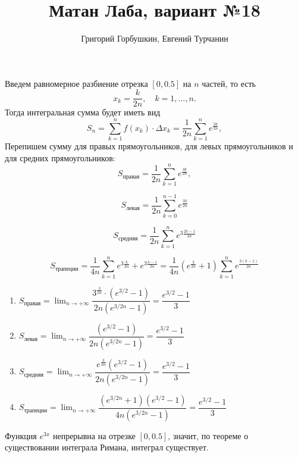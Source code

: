 \documentclass{report}
\title{\Huge{Матан Лаба, вариант №18}}
\author{\huge{Григорий Горбушкин, Евгений Турчанин}}
\date{}
\begin{document}
\maketitle

\noindent Введем равномерное разбиение отрезка $[0, 0.5]$ на $n$ частей, то есть
\begin{equation}
    x_k = \frac{k}{2n}, \quad k = 1, \ldots, n.
\end{equation}
Тогда интегральная сумма будет иметь вид
\begin{equation}
    S_n = \sum_{k=1}^{n} f(x_k) \cdot \Delta x_k = \frac{1}{2n} \sum_{k=1}^{n} e^{\frac{3k}{2n}},
\end{equation}
Перепишем сумму для правых прямоугольников, для левых прямоугольников и для средних прямоугольников:
\begin{equation}
    S_\text{правая} = \frac{1}{2n} \sum_{k=1}^{n} e^{\frac{3k}{2n}},
\end{equation}

\begin{equation}
    S_{\text{левая}} = \frac{1}{2n} \sum_{k=0}^{n-1} e^{\frac{3k}{2n}}
\end{equation}

\begin{equation}
    S_{\text{средняя}} = \frac{1}{2n} \sum_{k=1}^{n} e^{3\frac{2k-1}{4n}}
\end{equation}

\begin{equation}
    S_{\text{трапеции}} = \frac{1}{4n} \sum_{k=1}^{n} e^{3\frac{k}{2n}}+e^{3\frac{k-1}{2n}} =
    \frac{1}{4n}\left(e^{\frac{3}{2n}}+1 \right)\sum_{k=1}^{n} e^{\frac{3(k-1)}{2n}}
\end{equation}


\begin{enumerate}
    \item $S_{\text{правая}} = \displaystyle\lim_ {n \to +\infty} \dfrac{3^{\frac{3}{2n}}\cdot(e^{3/2}-1)}{2n(e^{3/2n}-1)} = \dfrac{e^{3/2}-1}{3}$
    \item $S_{\text{левая}} = \displaystyle\lim_ {n \to +\infty} \dfrac{(e^{3/2}-1)}{2n(e^{3/2n}-1)} = \dfrac{e^{3/2}-1}{3}$
    \item $S_{\text{средняя}} = \displaystyle\lim_ {n \to +\infty} \dfrac{e^{\frac{3}{4n}}(e^{3/2}-1)}{2n(e^{3/2n}-1)} = \dfrac{e^{3/2}-1}{3}$
    \item $S_{\text{трапеции}} = \displaystyle\lim_ {n \to +\infty} \dfrac{(e^{3/2n}+1)(e^{3/2}-1)}{4n(e^{3/2n}-1)} = \dfrac{e^{3/2}-1}{3}$

\end{enumerate}
\noindent Функция $e^{3x}$ непрерывна на отрезке $[0, 0.5]$, значит, по теореме о существовании интеграла Римана, интеграл существует.
\end{document}

